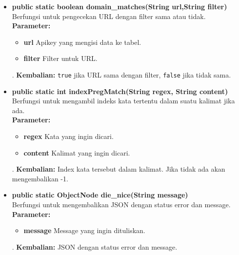 \begin{enumerate}
\begin{itemize}
		\item \textbf{public static boolean domain\_matches(String url,String filter)}\\
		Berfungsi untuk pengecekan URL dengan filter sama atau tidak.\\
		\textbf{Parameter:}
				\begin{itemize}
					\item \textbf{url} Apikey yang mengisi data ke tabel.
					\item \textbf{filter} Filter untuk URL.
				\end{itemize}.
		\textbf{Kembalian:}  \texttt{true} jika URL sama dengan filter, \texttt{false} jika tidak sama.
	
		
		\item \textbf{public static int indexPregMatch(String regex, String content)}\\
		Berfungsi untuk mengambil indeks kata tertentu dalam suatu kalimat jika ada.\\
		\textbf{Parameter:}
				\begin{itemize}
					\item \textbf{regex} Kata yang ingin dicari.
					\item \textbf{content} Kalimat yang ingin dicari.
				\end{itemize}.
		\textbf{Kembalian:}  Index kata tersebut dalam kalimat. Jika tidak ada akan mengembalikan -1.
		
		\item \textbf{public static ObjectNode die\_nice(String message)}\\
		Berfungsi untuk mengembalikan JSON dengan status error dan message.\\
		\textbf{Parameter:}
				\begin{itemize}
					\item \textbf{message} Message yang ingin dituliskan.
				\end{itemize}.
		\textbf{Kembalian:}  JSON dengan status error dan message.
		

\end{itemize}
\end{enumerate}
